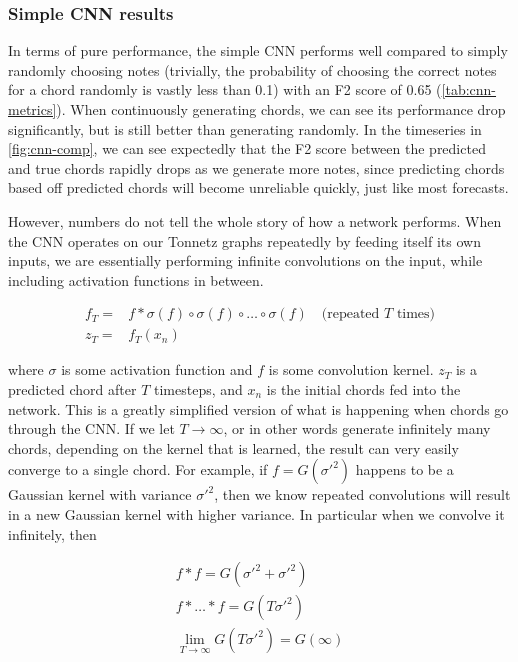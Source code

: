 \documentclass[
	a4paper, %
	10pt, %
	unnumberedsections, %
	twoside, %
]{LTJournalArticle}
\begin{document}
\subsubsection{Simple CNN results}

In terms of pure performance, the simple CNN performs well compared to simply randomly choosing notes (trivially, the probability of choosing the correct notes for a chord randomly is vastly less than 0.1) with an F2 score of 0.65 (\autoref{tab:cnn-metrics}). When continuously generating chords, we can see its performance drop significantly, but is still better than generating randomly. In the timeseries in \autoref{fig:cnn-comp}, we can see expectedly that the F2 score between the predicted and true chords rapidly drops as we generate more notes, since predicting chords based off predicted chords will become unreliable quickly, just like most forecasts.

However, numbers do not tell the whole story of how a network performs. When the CNN operates on our Tonnetz graphs repeatedly by feeding itself its own inputs, we are essentially performing infinite convolutions on the input, while including activation functions in between.

\begin{equation}
\begin{split}
    f_T = & f * \sigma(f) \circ \sigma(f) \circ \dots \circ \sigma(f) \quad\text{(repeated }T\text{ times)}\\
    z_T = & f_T(x_n)
\end{split}
\end{equation}

where $\sigma$ is some activation function and $f$ is some convolution kernel. $z_T$ is a predicted chord after $T$ timesteps, and $x_n$ is the initial chords fed into the network. This is a greatly simplified version of what is happening when chords go through the CNN. If we let $T\to\infty$, or in other words generate infinitely many chords, depending on the kernel that is learned, the result can very easily converge to a single chord. For example, if $f=G(\sigma'^2)$ happens to be a Gaussian kernel with variance $\sigma'^2$, then we know repeated convolutions will result in a new Gaussian kernel with higher variance. In particular when we convolve it infinitely, then

\begin{equation}
\begin{split}
    f * f = G(\sigma'^2+\sigma'^2) \\
    f * \dots * f = G(T\sigma'^2) \\
    \lim_{T\to\infty} G(T\sigma'^2) = G(\infty)
\end{split}
\end{equation}
\end{document}
